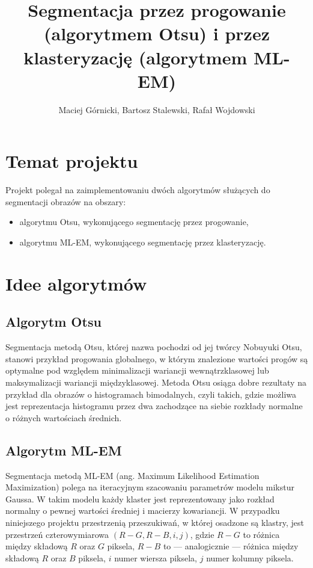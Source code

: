 \documentclass[10pt]{llncs}
\begin{document}
	
\title{Segmentacja przez progowanie (algorytmem Otsu) i przez klasteryzację (algorytmem ML-EM)}
\author{Maciej Górnicki, Bartosz Stalewski, Rafał Wojdowski}
\maketitle

\section{Temat projektu}

Projekt polegał na zaimplementowaniu dwóch algorytmów służących do segmentacji obrazów na obszary:
\begin{itemize}
	\item algorytmu Otsu, wykonującego segmentację przez progowanie,
	\item algorytmu ML-EM, wykonującego segmentację przez klasteryzację. 
\end{itemize}

\section{Idee algorytmów}

\subsection{Algorytm Otsu}

Segmentacja metodą Otsu, której nazwa pochodzi od jej twórcy Nobuyuki Otsu, stanowi przykład progowania globalnego, w którym znalezione wartości progów są optymalne pod względem minimalizacji wariancji wewnątrzklasowej lub maksymalizacji wariancji międzyklasowej. Metoda Otsu osiąga dobre rezultaty na przykład dla obrazów o histogramach bimodalnych, czyli takich, gdzie możliwa jest reprezentacja histogramu przez dwa zachodzące na siebie rozkłady normalne o różnych wartościach średnich.

\subsection{Algorytm ML-EM}

Segmentacja metodą ML-EM (ang. Maximum Likelihood Estimation Maximization) polega na iteracyjnym szacowaniu parametrów modelu mikstur Gaussa. W takim modelu każdy klaster jest reprezentowany jako rozkład normalny o pewnej wartości średniej i macierzy kowariancji. W przypadku niniejszego projektu przestrzenią przeszukiwań, w której osadzone są klastry, jest przestrzeń czterowymiarowa $(R-G, R-B, i, j)$, gdzie $R - G$ to różnica między składową $R$ oraz $G$ piksela, $R - B$ to --- analogicznie --- różnica między składową $R$ oraz $B$ piksela, $i$ numer wiersza piksela, $j$ numer kolumny piksela.
\end{document}
